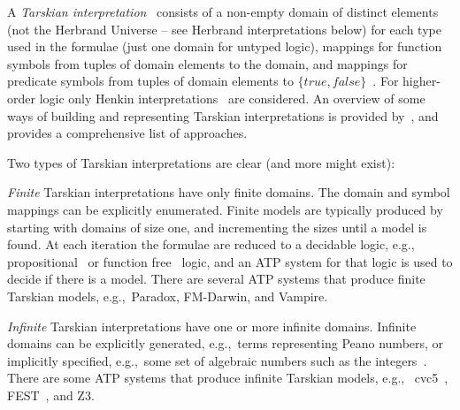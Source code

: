 \documentclass{easychair}
\newenvironment{packed_enumerate}{
\vspace*{-0.3em}
\begin{enumerate}
\setlength{\partopsep}{0pt}
\setlength{\itemsep}{1pt}
\setlength{\parskip}{0pt}
\setlength{\parsep}{0pt}
}{\end{enumerate}}
\begin{document}
A \emph{Tarskian interpretation}~\cite{TV56} consists of a non-empty domain of distinct elements 
(not the Herbrand Universe -- see Herbrand interpretations below) for each type used in the 
formulae (just one domain for untyped logic), mappings for function symbols from tuples of 
domain elements to the domain, and mappings for predicate symbols from tuples of domain elements 
to $\{true,false\}$~\cite{Hun96,Gal15}.
For higher-order logic only Henkin interpretations~\cite{Hen50} are considered.
An overview of some ways of building and representing Tarskian interpretations is provided 
by~\cite{CLP04}, and~\cite{Pel03-EQMC} provides a comprehensive list of approaches.

Two types of Tarskian interpretations are clear (and more might exist):
\begin{packed_enumerate}
\item \emph{Finite} Tarskian interpretations have only finite domains.
      The domain and symbol mappings can be explicitly enumerated.
      Finite models are typically produced by starting with domains of size one, and incrementing 
      the sizes until a model is found.
      At each iteration the formulae are reduced to a decidable logic, e.g.,~
      propositional~\cite{CS03,McC03-MACE4-TR} or function free~\cite{BF+09} logic, and an ATP 
      system for that logic is used to decide if there is a model.
      There are several ATP systems that produce finite Tarskian models, e.g.,~Paradox, FM-Darwin, 
      and Vampire.
\item \emph{Infinite} Tarskian interpretations have one or more infinite domains.
      Infinite domains can be explicitly generated, e.g.,~terms representing Peano numbers, or 
      implicitly specified, e.g.,~some set of algebraic numbers such as the integers~\cite{BB13}.
      There are some ATP systems that produce infinite Tarskian models, e.g.,~
      cvc5~\cite{BB+22-cvc5}, FEST~\cite{EPS24}, and Z3.
\end{packed_enumerate}
\end{document}
